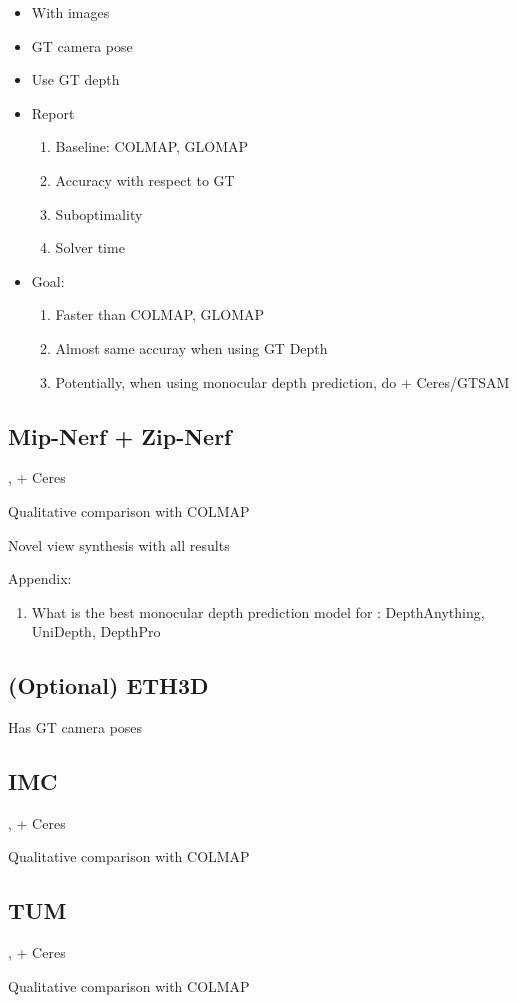 \begin{itemize}
    \item With images
    \item GT camera pose
    \item Use GT depth
    \item Report
    \begin{enumerate}
        \item Baseline: COLMAP, GLOMAP
        \item Accuracy with respect to GT
        \item Suboptimality
        \item Solver time
    \end{enumerate}
    \item Goal:
    \begin{enumerate}
        \item Faster than COLMAP, GLOMAP
        \item Almost same accuray when using GT Depth 
        \item Potentially, when using monocular depth prediction, do \nameshort + Ceres/GTSAM
    \end{enumerate}
\end{itemize}

\subsection{Mip-Nerf + Zip-Nerf}

\nameshort, \nameshort + Ceres

Qualitative comparison with COLMAP

Novel view synthesis with all results

Appendix:
\begin{enumerate}
    \item What is the best monocular depth prediction model for \nameshort: DepthAnything, UniDepth, DepthPro
\end{enumerate}

\subsection{(Optional) ETH3D}

Has GT camera poses




\subsection{IMC}

\nameshort, \nameshort + Ceres

Qualitative comparison with COLMAP

\subsection{TUM}

\nameshort, \nameshort + Ceres

Qualitative comparison with COLMAP


